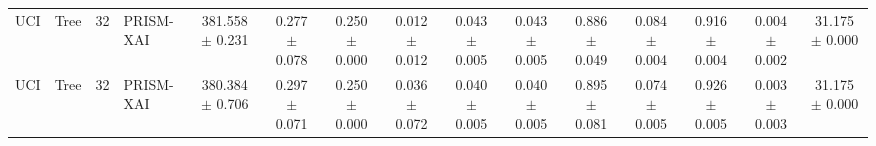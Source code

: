 \begin{table}[t]
\begin{tabular}{llllccccccccccc}
UCI & Tree & 32 & PRISM-XAI & 381.558 $\pm$ 0.231 & 0.277 $\pm$ 0.078 & 0.250 $\pm$ 0.000 & 0.012 $\pm$ 0.012 & 0.043 $\pm$ 0.005 & 0.043 $\pm$ 0.005 & 0.886 $\pm$ 0.049 & 0.084 $\pm$ 0.004 & 0.916 $\pm$ 0.004 & 0.004 $\pm$ 0.002 & 31.175 $\pm$ 0.000 \\
UCI & Tree & 32 & PRISM-XAI & 380.384 $\pm$ 0.706 & 0.297 $\pm$ 0.071 & 0.250 $\pm$ 0.000 & 0.036 $\pm$ 0.072 & 0.040 $\pm$ 0.005 & 0.040 $\pm$ 0.005 & 0.895 $\pm$ 0.081 & 0.074 $\pm$ 0.005 & 0.926 $\pm$ 0.005 & 0.003 $\pm$ 0.003 & 31.175 $\pm$ 0.000 \\
\bottomrule
\end{tabular}
\end{table}

